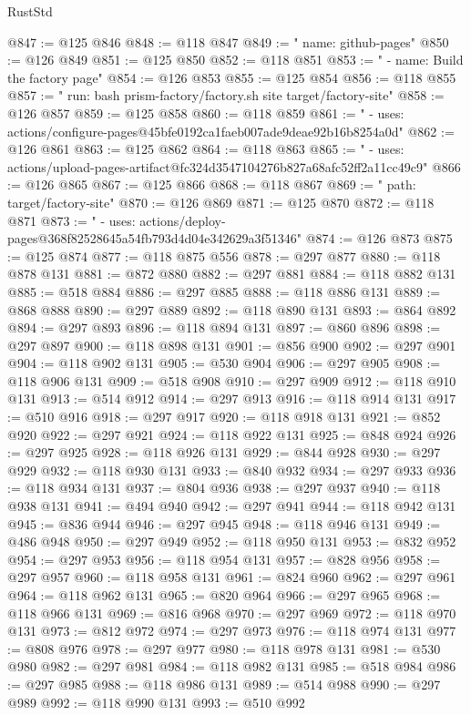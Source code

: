 \begin{lexlean}{RustStd}
\begin{coremodule}
@847 := @125 @846
@848 := @118 @847
@849 := "      name: github-pages"
@850 := @126 @849
@851 := @125 @850
@852 := @118 @851
@853 := "      - name: Build the factory page"
@854 := @126 @853
@855 := @125 @854
@856 := @118 @855
@857 := "        run: bash prism-factory/factory.sh site target/factory-site"
@858 := @126 @857
@859 := @125 @858
@860 := @118 @859
@861 := "      - uses: actions/configure-pages@45bfe0192ca1faeb007ade9deae92b16b8254a0d"
@862 := @126 @861
@863 := @125 @862
@864 := @118 @863
@865 := "      - uses: actions/upload-pages-artifact@fc324d3547104276b827a68afc52ff2a11cc49c9"
@866 := @126 @865
@867 := @125 @866
@868 := @118 @867
@869 := "          path: target/factory-site"
@870 := @126 @869
@871 := @125 @870
@872 := @118 @871
@873 := "      - uses: actions/deploy-pages@368f82528645a54fb793d4d04e342629a3f51346"
@874 := @126 @873
@875 := @125 @874
@877 := @118 @875 @556
@878 := @297 @877
@880 := @118 @878 @131
@881 := @872 @880
@882 := @297 @881
@884 := @118 @882 @131
@885 := @518 @884
@886 := @297 @885
@888 := @118 @886 @131
@889 := @868 @888
@890 := @297 @889
@892 := @118 @890 @131
@893 := @864 @892
@894 := @297 @893
@896 := @118 @894 @131
@897 := @860 @896
@898 := @297 @897
@900 := @118 @898 @131
@901 := @856 @900
@902 := @297 @901
@904 := @118 @902 @131
@905 := @530 @904
@906 := @297 @905
@908 := @118 @906 @131
@909 := @518 @908
@910 := @297 @909
@912 := @118 @910 @131
@913 := @514 @912
@914 := @297 @913
@916 := @118 @914 @131
@917 := @510 @916
@918 := @297 @917
@920 := @118 @918 @131
@921 := @852 @920
@922 := @297 @921
@924 := @118 @922 @131
@925 := @848 @924
@926 := @297 @925
@928 := @118 @926 @131
@929 := @844 @928
@930 := @297 @929
@932 := @118 @930 @131
@933 := @840 @932
@934 := @297 @933
@936 := @118 @934 @131
@937 := @804 @936
@938 := @297 @937
@940 := @118 @938 @131
@941 := @494 @940
@942 := @297 @941
@944 := @118 @942 @131
@945 := @836 @944
@946 := @297 @945
@948 := @118 @946 @131
@949 := @486 @948
@950 := @297 @949
@952 := @118 @950 @131
@953 := @832 @952
@954 := @297 @953
@956 := @118 @954 @131
@957 := @828 @956
@958 := @297 @957
@960 := @118 @958 @131
@961 := @824 @960
@962 := @297 @961
@964 := @118 @962 @131
@965 := @820 @964
@966 := @297 @965
@968 := @118 @966 @131
@969 := @816 @968
@970 := @297 @969
@972 := @118 @970 @131
@973 := @812 @972
@974 := @297 @973
@976 := @118 @974 @131
@977 := @808 @976
@978 := @297 @977
@980 := @118 @978 @131
@981 := @530 @980
@982 := @297 @981
@984 := @118 @982 @131
@985 := @518 @984
@986 := @297 @985
@988 := @118 @986 @131
@989 := @514 @988
@990 := @297 @989
@992 := @118 @990 @131
@993 := @510 @992

\end{coremodule}
\end{lexlean}
